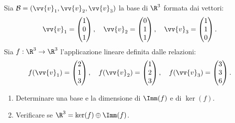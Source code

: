 \begin{tcolorbox}[colback=white, colframe=navyblue, title={\textbf{Testo del Problema 2 — Applicazione Lineare su Base Non Canonica}}]
Sia $\mathcal{B} = (\vv{v}_1, \vv{v}_2, \vv{v}_3)$ la base di $\R^3$ formata dai vettori:
\begin{equation}
    \vv{v}_1 = \begin{pmatrix} 1 \\ 0 \\ 1 \end{pmatrix}, \quad \vv{v}_2 = \begin{pmatrix} 0 \\ 1 \\ 1 \end{pmatrix}, \quad \vv{v}_3 = \begin{pmatrix} 1 \\ 1 \\ 0 \end{pmatrix}.
\end{equation}
Sia $f: \R^3 \to \R^3$ l'applicazione lineare definita dalle relazioni:
\begin{equation}
    f(\vv{v}_1) = \begin{pmatrix} 2 \\ 1 \\ 3 \end{pmatrix}, \quad f(\vv{v}_2) = \begin{pmatrix} 1 \\ 2 \\ 3 \end{pmatrix}, \quad f(\vv{v}_3) = \begin{pmatrix} 3 \\ 3 \\ 6 \end{pmatrix}.
\end{equation}
\begin{enumerate}[label=(\roman*)]
    \item Determinare una base e la dimensione di $\Imm(f)$ e di $\ker(f)$.
    \item Verificare se $\R^3 = \ker(f) \oplus \Imm(f)$.
\end{enumerate}
\end{tcolorbox}

